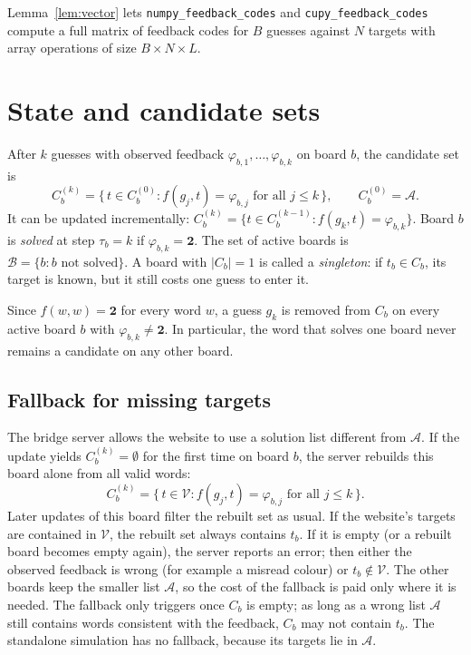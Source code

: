 \documentclass[11pt,a4paper]{article}
\theoremstyle{definition}
\theoremstyle{remark}
\newcommand{\A}{\mathcal{A}}
\newcommand{\V}{\mathcal{V}}
\newcommand{\B}{\mathcal{B}}
\newcommand{\green}{\mathbf{2}}
\begin{document}
Lemma~\ref{lem:vector} lets \texttt{numpy\_feedback\_codes} and
\texttt{cupy\_feedback\_codes} compute a full matrix of feedback codes for
$B$ guesses against $N$ targets with array operations of size $B \times N \times L$.

\section{State and candidate sets}

After $k$ guesses with observed feedback $\varphi_{b,1},\dots,\varphi_{b,k}$ on board $b$,
the candidate set is
\[
  C_b^{(k)} = \bigl\{\, t \in C_b^{(0)} : f(g_j, t) = \varphi_{b,j}
  \text{ for all } j \le k \,\bigr\},
  \qquad C_b^{(0)} = \A .
\]
It can be updated incrementally:
$C_b^{(k)} = \{ t \in C_b^{(k-1)} : f(g_k,t) = \varphi_{b,k} \}$.
Board $b$ is \emph{solved} at step $\tau_b = k$ if $\varphi_{b,k} = \green$.
The set of active boards is $\B = \{ b : b \text{ not solved} \}$.
A board with $|C_b| = 1$ is called a \emph{singleton}: if $t_b \in C_b$, its target is
known, but it still costs one guess to enter it.

Since $f(w,w) = \green$ for every word $w$, a guess $g_k$ is removed from $C_b$ on every
active board $b$ with $\varphi_{b,k} \neq \green$. In particular, the word that solves one
board never remains a candidate on any other board.

\subsection{Fallback for missing targets}
\label{sec:fallback}

The bridge server allows the website to use a solution list different from $\A$.
If the update yields $C_b^{(k)} = \emptyset$ for the first time on board $b$, the server
rebuilds this board alone from all valid words:
\[
  C_b^{(k)} = \bigl\{\, t \in \V : f(g_j,t) = \varphi_{b,j} \text{ for all } j \le k \,\bigr\}.
\]
Later updates of this board filter the rebuilt set as usual.
If the website's targets are contained in $\V$, the rebuilt set always contains $t_b$.
If it is empty (or a rebuilt board becomes empty again), the server reports an error;
then either the observed feedback is wrong (for example a misread colour) or
$t_b \notin \V$. The other boards keep the smaller list $\A$,
so the cost of the fallback is paid only where it is needed.
The fallback only triggers once $C_b$ is empty; as long as a wrong list $\A$ still
contains words consistent with the feedback, $C_b$ may not contain $t_b$.
The standalone simulation has no fallback, because its targets lie in $\A$.
\end{document}
